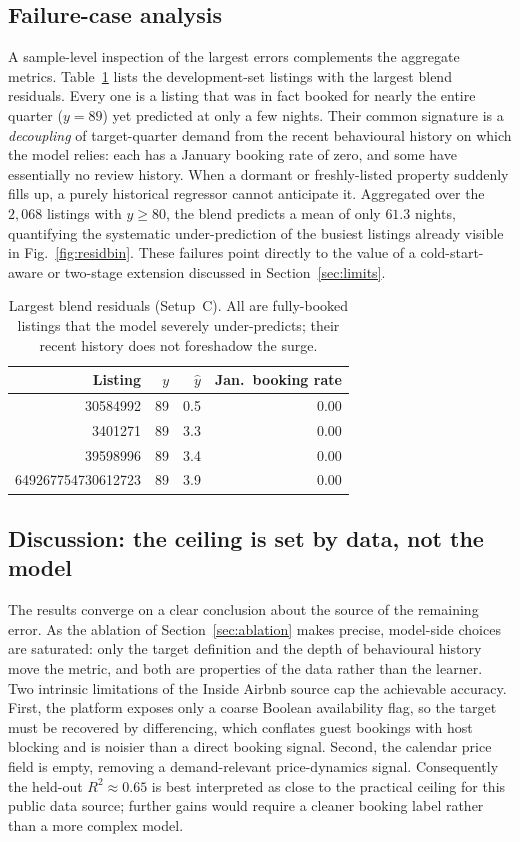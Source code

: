 \documentclass[review,12pt]{elsarticle}
\begin{document}
\subsection{Failure-case analysis}
A sample-level inspection of the largest errors complements the aggregate metrics.
Table~\ref{tab:failure} lists the development-set listings with the largest blend
residuals. Every one is a listing that was in fact booked for nearly the entire
quarter ($y=89$) yet predicted at only a few nights. Their common signature is a
\emph{decoupling} of target-quarter demand from the recent behavioural history on
which the model relies: each has a January booking rate of zero, and some have
essentially no review history. When a dormant or freshly-listed property suddenly
fills up, a purely historical regressor cannot anticipate it. Aggregated over the
$2{,}068$ listings with $y\ge 80$, the blend predicts a mean of only $61.3$ nights,
quantifying the systematic under-prediction of the busiest listings already visible
in Fig.~\ref{fig:residbin}. These failures point directly to the value of a
cold-start-aware or two-stage extension discussed in Section~\ref{sec:limits}.

\begin{table}[!t]
\caption{Largest blend residuals (Setup~C). All are fully-booked listings that the
model severely under-predicts; their recent history does not foreshadow the surge.}
\label{tab:failure}
\centering
\small
\begin{tabular}{rrrr}
\toprule
Listing & $y$ & $\hat y$ & Jan.\ booking rate \\
\midrule
30584992 & 89 & 0.5 & 0.00 \\
3401271 & 89 & 3.3 & 0.00 \\
39598996 & 89 & 3.4 & 0.00 \\
649267754730612723 & 89 & 3.9 & 0.00 \\
\bottomrule
\end{tabular}
\end{table}

\subsection{Discussion: the ceiling is set by data, not the model}
The results converge on a clear conclusion about the source of the remaining
error. As the ablation of Section~\ref{sec:ablation} makes precise, model-side
choices are saturated: only the target definition and the depth of behavioural
history move the metric, and both are properties of the data rather than the
learner. Two intrinsic limitations of the Inside Airbnb source cap the achievable
accuracy. First, the platform exposes only a coarse Boolean availability flag, so
the target must be recovered by differencing, which conflates guest bookings with
host blocking and is noisier than a direct booking signal. Second, the calendar
price field is empty, removing a demand-relevant price-dynamics signal.
Consequently the held-out $R^2\approx0.65$ is best interpreted as close to the
practical ceiling for this public data source; further gains would require a
cleaner booking label rather than a more complex model.
\end{document}
